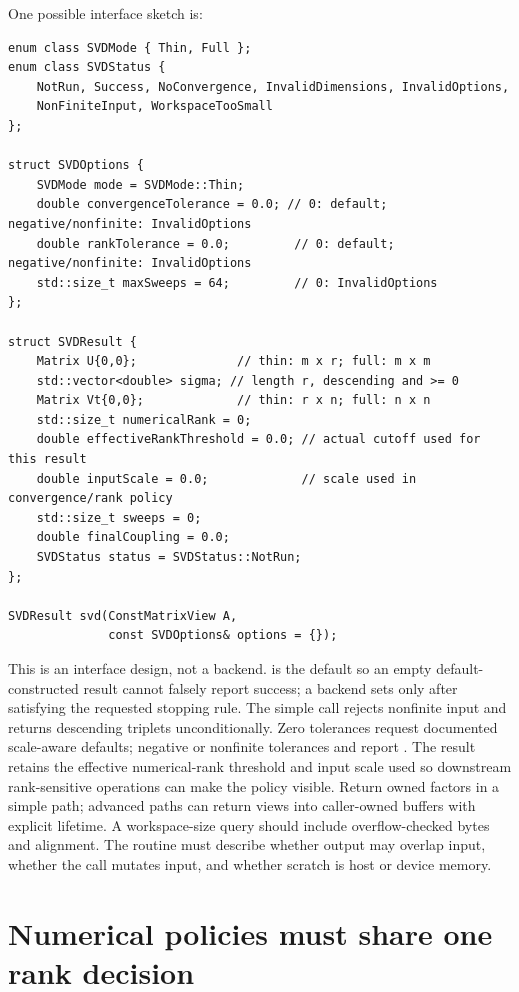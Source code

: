 One possible interface sketch is:

\begin{verbatim}
enum class SVDMode { Thin, Full };
enum class SVDStatus {
    NotRun, Success, NoConvergence, InvalidDimensions, InvalidOptions,
    NonFiniteInput, WorkspaceTooSmall
};

struct SVDOptions {
    SVDMode mode = SVDMode::Thin;
    double convergenceTolerance = 0.0; // 0: default; negative/nonfinite: InvalidOptions
    double rankTolerance = 0.0;         // 0: default; negative/nonfinite: InvalidOptions
    std::size_t maxSweeps = 64;         // 0: InvalidOptions
};

struct SVDResult {
    Matrix U{0,0};              // thin: m x r; full: m x m
    std::vector<double> sigma; // length r, descending and >= 0
    Matrix Vt{0,0};             // thin: r x n; full: n x n
    std::size_t numericalRank = 0;
    double effectiveRankThreshold = 0.0; // actual cutoff used for this result
    double inputScale = 0.0;             // scale used in convergence/rank policy
    std::size_t sweeps = 0;
    double finalCoupling = 0.0;
    SVDStatus status = SVDStatus::NotRun;
};

SVDResult svd(ConstMatrixView A,
              const SVDOptions& options = {});
\end{verbatim}

This is an interface design, not a backend.  is the default so an empty default-constructed result cannot falsely report success; a backend sets  only after satisfying the requested stopping rule. The simple call rejects nonfinite input and returns descending triplets unconditionally. Zero tolerances request documented scale-aware defaults; negative or nonfinite tolerances and  report . The result retains the effective numerical-rank threshold and input scale used so downstream rank-sensitive operations can make the policy visible. Return owned factors in a simple path; advanced paths can return views into caller-owned buffers with explicit lifetime. A workspace-size query should include overflow-checked bytes and alignment. The routine must describe whether output may overlap input, whether the call mutates input, and whether scratch is host or device memory.

\section{Numerical policies must share one rank decision}\label{02-foundations-ii-ch038-numerical-policies-must-share-one-rank-decision}

